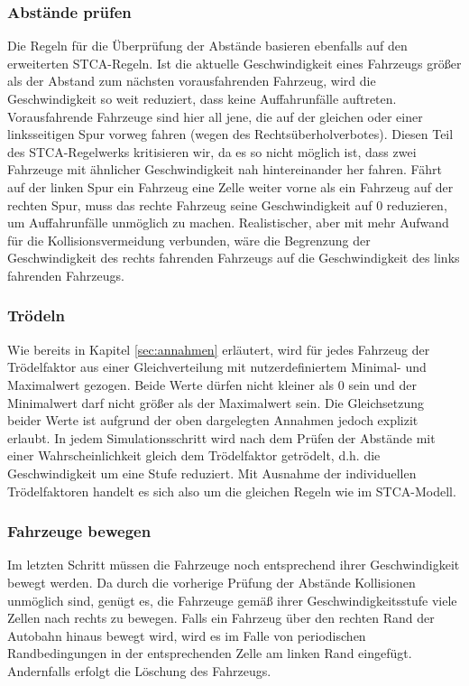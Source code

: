 \documentclass[10pt, a4paper]{article}
\begin{document}
\subsubsection{Abstände prüfen}
\label{subsubsec:abstaendePruefen}
Die Regeln für die Überprüfung der Abstände basieren ebenfalls auf den erweiterten STCA-Regeln. Ist die aktuelle Geschwindigkeit eines Fahrzeugs größer als der Abstand zum nächsten vorausfahrenden Fahrzeug, wird die Geschwindigkeit so weit reduziert, dass keine Auffahrunfälle auftreten. Vorausfahrende Fahrzeuge sind hier all jene, die auf der gleichen oder einer linksseitigen Spur vorweg fahren (wegen des Rechtsüberholverbotes). Diesen Teil des STCA-Regelwerks kritisieren wir, da es so nicht möglich ist, dass zwei Fahrzeuge mit ähnlicher Geschwindigkeit nah hintereinander her fahren. Fährt auf der linken Spur ein Fahrzeug eine Zelle weiter vorne als ein Fahrzeug auf der rechten Spur, muss das rechte Fahrzeug seine Geschwindigkeit auf 0 reduzieren, um Auffahrunfälle unmöglich zu machen. 
Realistischer, aber mit mehr Aufwand für die Kollisionsvermeidung verbunden, wäre die Begrenzung der Geschwindigkeit des rechts fahrenden Fahrzeugs auf die Geschwindigkeit des links fahrenden Fahrzeugs.

\subsubsection{Trödeln}
\label{subsubsec:troedeln}

Wie bereits in Kapitel \ref{sec:annahmen} erläutert, wird für jedes Fahrzeug der Trödelfaktor aus einer Gleichverteilung mit nutzerdefiniertem Minimal- und Maximalwert gezogen. Beide Werte dürfen nicht kleiner als 0 sein und der Minimalwert darf nicht größer als der Maximalwert sein. Die Gleichsetzung beider Werte ist aufgrund der oben dargelegten Annahmen jedoch explizit erlaubt. In jedem Simulationsschritt wird nach dem Prüfen der Abstände mit einer Wahrscheinlichkeit gleich dem Trödelfaktor getrödelt, d.h. die Geschwindigkeit um eine Stufe reduziert. Mit Ausnahme der individuellen Trödelfaktoren handelt es sich also um die gleichen Regeln wie im STCA-Modell.

\subsubsection{Fahrzeuge bewegen}
\label{subsubsec:fahrzeugeBewegen}

Im letzten Schritt müssen die Fahrzeuge noch entsprechend ihrer Geschwindigkeit bewegt werden. Da durch die vorherige Prüfung der Abstände Kollisionen unmöglich sind, genügt es, die Fahrzeuge gemäß ihrer Geschwindigkeitsstufe viele Zellen nach rechts zu bewegen. Falls ein Fahrzeug über den rechten Rand der Autobahn hinaus bewegt wird, wird es im Falle von periodischen Randbedingungen in der entsprechenden Zelle am linken Rand eingefügt. Andernfalls erfolgt die Löschung des Fahrzeugs. 
\end{document}

